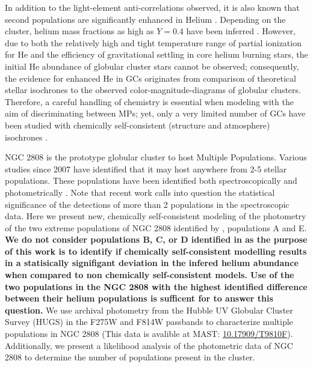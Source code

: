 In addition to the light-element anti-correlations observed, it is also known
that second populations are significantly enhanced in Helium
\citep{Piotto2007, Piotto2015, Latour2019}. Depending on the cluster, helium
mass fractions as high as $Y=0.4$ have been inferred \citep[e.g][]{Milone2015}.
However, due to both the relatively high and tight temperature range of partial
ionization for He and the efficiency of gravitational settling in core helium
burning stars, the initial He abundance of globular cluster stars cannot be
observed; consequently, the evidence for enhanced He in GCs originates from
comparison of theoretical stellar isochrones to the observed
color-magnitude-diagrams of globular clusters. Therefore, a careful handling of
chemistry is essential when modeling with the aim of discriminating between
MPs; yet, only a very limited number of GCs have been studied with
chemically self-consistent (structure and atmosphere) isochrones
\citep[e.g.][NGC 6752]{Dotter2015}. 

NGC 2808 is the prototype globular cluster to host Multiple Populations.
Various studies since 2007 have identified that it may host anywhere from 2-5
stellar populations. These populations have been identified both
spectroscopically \citep[i.e.][]{Carretta2004, Carretta2006, Carretta2010,
Gratton2011, Carretta2015, Hong2021} and photometrically
\citep[i.e.][]{Piotto2007, Piotto2015, Milone2015, Milone2017, Pasquato2019}.
Note that recent work \citep{Valle2022} calls into question the statistical
significance of the detections of more than 2 populations in the spectroscopic
data. Here we present new, chemically self-consistent modeling of the
photometry of the two extreme populations of NGC 2808 identified by
\citet{Milone2015}, populations A and E. {\bf We do not consider populations B,
C, or D identified in \citet{Milone2015} as the purpose of this work is to
identify if chemically self-consistent modelling results in a statisically
signifigant deviation in the infered helium abundance when compared to non
chemically self-consistent models. Use of the two populations in the NGC 2808
with the highest identified difference between their helium populations is
sufficent for to answer this question.}  We use archival photometry from the
Hubble UV Globular Cluster Survey (HUGS) \citep{Piotto2015, Milone2017} in the
F275W and F814W passbands to characterize multiple populations in NGC 2808
\citep{Milone2015, Milone2015b} (This data is avalible at MAST: \href{https://archive.stsci.edu/doi/resolve/resolve.html?doi=10.17909/T9810F}{10.17909/T9810F}). Additionally, we present a
likelihood analysis of the photometric data of NGC 2808 to determine the number
of populations present in the cluster.


